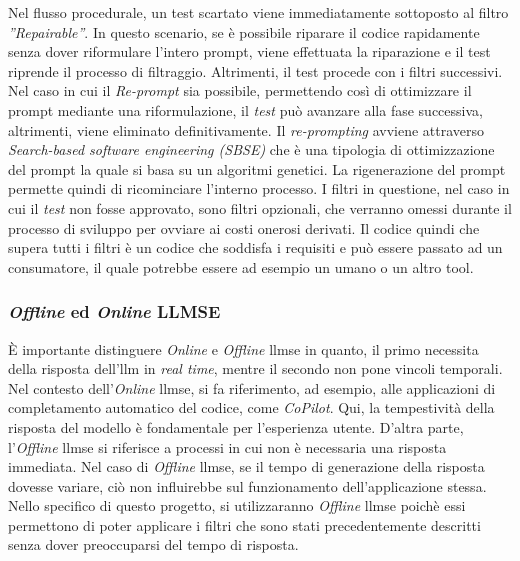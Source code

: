     Nel flusso procedurale, un test scartato viene immediatamente sottoposto al filtro \textit{''Repairable''}. In questo scenario, se è possibile riparare il codice rapidamente senza dover riformulare l'intero prompt, viene effettuata la riparazione e il test riprende il processo di filtraggio. Altrimenti, il test procede con i filtri successivi.
    Nel caso in cui il \textit{Re-prompt} sia possibile, permettendo così di ottimizzare il prompt mediante una riformulazione, il \textit{test} può avanzare alla fase successiva, altrimenti, viene eliminato definitivamente.
    Il \textit{re-prompting} avviene attraverso \textit{Search-based software engineering (SBSE)} che è una tipologia di ottimizzazione del prompt la quale si basa su un algoritmi genetici. La rigenerazione del prompt permette quindi di ricominciare l'interno processo.
    I filtri in questione, nel caso in cui il \textit{test} non fosse approvato, sono filtri opzionali, che verranno omessi durante il processo di sviluppo per ovviare ai costi onerosi derivati.
    Il codice quindi che supera tutti i filtri è un codice che soddisfa i requisiti e può essere passato ad un consumatore, il quale potrebbe essere ad esempio un umano o un altro tool.\newline
    \subsubsection{\textit{Offline} ed \textit{Online} LLMSE}
        È importante distinguere \textit{Online} e \textit{Offline} \gls{llmse} in quanto, il primo necessita della risposta dell'\gls{llm} in \textit{real time}, mentre il secondo non pone vincoli temporali.
        Nel contesto dell'\textit{Online} \gls{llmse}, si fa riferimento, ad esempio, alle applicazioni di completamento automatico del codice, come \textit{CoPilot}. Qui, la tempestività della risposta del modello è fondamentale per l'esperienza utente.
        D'altra parte, l'\textit{Offline} \gls{llmse} si riferisce a processi in cui non è necessaria una risposta immediata. Nel caso di \textit{Offline} \gls{llmse}, se il tempo di generazione della risposta dovesse variare, ciò non influirebbe sul funzionamento dell'applicazione stessa. Nello specifico di questo progetto, si utilizzaranno \textit{Offline} \gls{llmse} poichè essi permettono
        di poter applicare i filtri che sono stati precedentemente descritti senza dover preoccuparsi del tempo di risposta.
